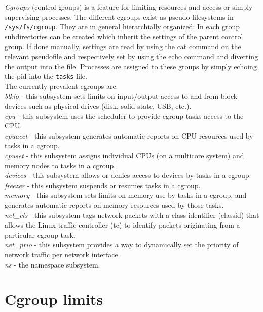 \textit{Cgroups} (control groups) is a feature for limiting resources and access or simply supervising processes. The different cgroups exist as
pseudo filesystems in \texttt{/sys/fs/cgroup}. They are in general hierarchially organized: In each group subdirectories can be created
which inherit the settings of the parent control group. If done manually, settings are read by using the cat command on the relevant
pseudofile and respectively set by using the echo command and diverting the output into the file. Processes are assigned to these groups
by simply echoing the pid into the \texttt{tasks} file.\\
The currently prevalent cgroups are:\\
\textit{blkio} - this subsystem sets limits on input/output access to and from block devices such as physical drives (disk, solid state, USB, etc.).\\
\textit{cpu} - this subsystem uses the scheduler to provide cgroup tasks access to the CPU.\\
\textit{cpuacct} - this subsystem generates automatic reports on CPU resources used by tasks in a cgroup.\\
\textit{cpuset} - this subsystem assigns individual CPUs (on a multicore system) and memory nodes to tasks in a cgroup.\\
\textit{devices} - this subsystem allows or denies access to devices by tasks in a cgroup. \\
\textit{freezer} - this subsystem suspends or resumes tasks in a cgroup.\\
\textit{memory} - this subsystem sets limits on memory use by tasks in a cgroup, and generates automatic reports on memory resources used by those tasks.\\
\textit{net\_cls} - this subsystem tags network packets with a class identifier (classid) that allows the Linux traffic controller (tc) to identify
packets originating from a particular cgroup task. \\
\textit{net\_prio} - this subsystem provides a way to dynamically set the priority of network traffic per network interface.\\
\textit{ns} - the namespace subsystem.\\
\cite{cgroups}

\section{Cgroup limits}

